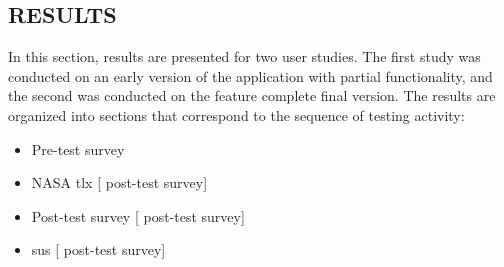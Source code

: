 \documentclass[thesis]{fputhesis}
\begin{document}
\begin{body}
\chapter{RESULTS}
In this section, results are presented for two user studies. The first study was conducted on an early version of the application with partial functionality, and the second was conducted on the feature complete final version. The results are organized into sections that correspond to the sequence of testing activity:
\begin{itemize}
    \item Pre-test survey
    \item NASA \acrfull{tlx} [ post-test survey]
    \item Post-test survey [ post-test survey]
    \item \acrfull{sus} [ post-test survey]
\end{itemize}

\end{body}
\end{document}
